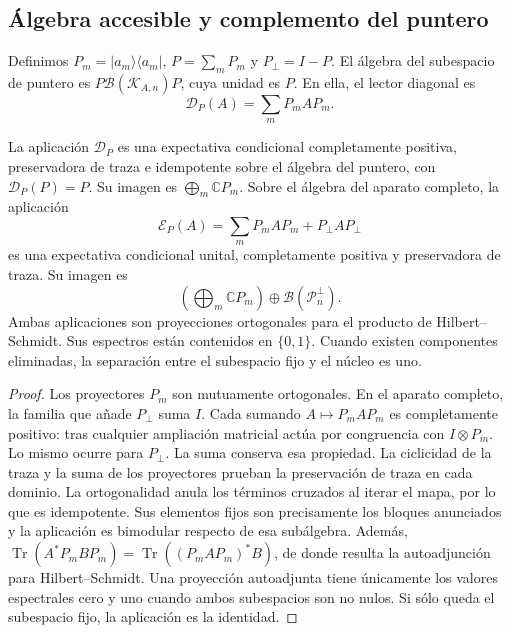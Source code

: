 

\subsection{Álgebra accesible y complemento del puntero}
\label{vii:sec:observador-expectativa}

Definimos \(P_m=|a_m\rangle\langle a_m|\),
\(P=\sum_mP_m\) y \(P_\perp=I-P\). El álgebra del subespacio de
puntero es \(P\mathcal B(\mathcal K_{A,n})P\), cuya unidad es \(P\).
En ella, el lector diagonal es
\[
 \mathcal D_P(A)=\sum_mP_mAP_m.
\]

\begin{proposition}
\label{vii:prop:observador-pinzamiento}
La aplicación \(\mathcal D_P\) es una expectativa condicional
completamente positiva, preservadora de traza e idempotente sobre el
álgebra del puntero, con \(\mathcal D_P(P)=P\). Su imagen es
\(\bigoplus_m\mathbb CP_m\).
Sobre el álgebra del aparato completo, la aplicación
\begin{equation}
 \mathcal E_P(A)=\sum_mP_mAP_m+P_\perp AP_\perp
 \label{vii:eq:observador-complemento}
\end{equation}
es una expectativa condicional unital, completamente positiva y
preservadora de traza. Su imagen es
\[
 \left(\bigoplus_m\mathbb CP_m\right)
 \oplus\mathcal B(\mathcal P_n^\perp).
\]
Ambas aplicaciones son proyecciones ortogonales para el producto de
Hilbert--Schmidt. Sus espectros están contenidos en \(\{0,1\}\).
Cuando existen componentes eliminadas, la separación entre el
subespacio fijo y el núcleo es uno.
\end{proposition}

\begin{proof}
Los proyectores \(P_m\) son mutuamente ortogonales. En el aparato
completo, la familia que añade \(P_\perp\) suma \(I\). Cada sumando
\(A\mapsto P_mAP_m\) es completamente positivo: tras cualquier
ampliación matricial actúa por congruencia con \(I\otimes P_m\).
Lo mismo ocurre para \(P_\perp\). La suma conserva esa propiedad.
La ciclicidad de la traza y la suma de los proyectores prueban la
preservación de traza en cada dominio. La ortogonalidad anula los
términos cruzados al iterar el mapa, por lo que es idempotente.
Sus elementos fijos son precisamente los bloques anunciados y la
aplicación es bimodular respecto de esa subálgebra.
Además,
\(\operatorname{Tr}(A^*P_mBP_m)
 =\operatorname{Tr}((P_mAP_m)^*B)\),
de donde resulta la autoadjunción para Hilbert--Schmidt. Una proyección
autoadjunta tiene únicamente los valores espectrales cero y uno cuando
ambos subespacios son no nulos. Si sólo queda el subespacio fijo,
la aplicación es la identidad.
\end{proof}

